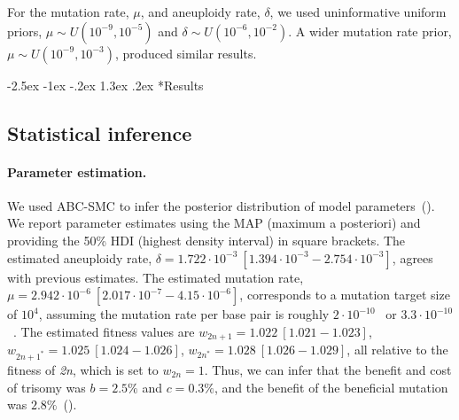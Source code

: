 \documentclass[12pt]{extarticle}
\makeatletter
\renewcommand\section{\@startsection {section}{1}{\z@}%
     {-2.5ex \@plus -1ex \@minus -.2ex}%
     {1.3ex \@plus.2ex}%
    {\Large\bfseries}}
\newcommand{\euwt}{\emph{2n}}
\makeatother
\begin{document}
For the mutation rate, $\mu$, and aneuploidy rate, $\delta$, we used uninformative uniform priors, $\mu \sim \mathit{U}(10^{-9},10^{-5})$ and $\delta \sim \mathit{U}(10^{-6},10^{-2})$. A wider mutation rate prior, $\mu \sim \mathit{U}(10^{-9},10^{-3})$, produced similar results.

\section*{Results}

\subsection*{Statistical inference}

\paragraph{Parameter estimation.} 
We used ABC-SMC to infer the posterior distribution of model parameters~(). 
We report parameter estimates using the MAP (maximum a posteriori) and providing the 50\% HDI (highest density interval) in square brackets.
The estimated aneuploidy rate, $\delta=1.722\cdot10^{-3}\ [1.394\cdot10^{-3}-2.754\cdot10^{-3}]$, agrees with previous estimates. %
The estimated mutation rate, $\mu=2.942\cdot10^{-6}\ [2.017\cdot10^{-7}-4.15\cdot10^{-6}]$, corresponds to a mutation target size of $10^{4}$, assuming the mutation rate per base pair is roughly $2\cdot10^{-10}$~\citep{Zhu2014} or $3.3\cdot10^{-10}$~\citep{Lynch2008}.
The estimated fitness values are $w_{2n+1}=1.022\ [1.021-1.023]$,
$w_{2n+1^*}=1.025\ [1.024-1.026]$,
$w_{2n^*}=1.028\ [1.026-1.029]$, all relative to the fitness of \euwt, which is set to $w_{2n}=1$. 
Thus, we can infer that the benefit and cost of trisomy was $b=2.5\%$ and $c=0.3\%$, and the benefit of the beneficial mutation was $2.8\%$~(). 
\end{document}
